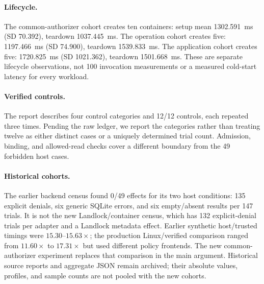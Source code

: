 \paragraph{Lifecycle.}
The common-authorizer cohort creates ten containers: setup mean 1302.591~ms
(SD 70.392), teardown 1037.445~ms. The operation cohort creates five:
1197.466~ms (SD 74.900), teardown 1539.833~ms. The application cohort creates
five: 1720.825~ms (SD 1021.362), teardown 1501.668~ms. These are separate
lifecycle observations, not 100 invocation measurements or a measured cold-start
latency for every workload.

\paragraph{Verified controls.}
The report describes four control categories and 12/12 controls, each repeated
three times. Pending the raw ledger, we report the categories rather than
treating twelve as either distinct cases or a uniquely determined trial count.
Admission, binding, and allowed-read checks cover a different boundary from
the 49 forbidden host cases.

\paragraph{Historical cohorts.}
The earlier backend census found 0/49 effects for its two host conditions:
135 explicit denials, six generic SQLite errors, and six empty/absent results
per 147 trials. It is not the new Landlock/container census, which has 132
explicit-denial trials per adapter and a Landlock metadata effect.
Earlier synthetic host/trusted timings were $15.30$--$15.63\times$; the
production Linux/verified comparison ranged from $11.60\times$ to
$17.31\times$ but used
different policy frontends. The new common-authorizer experiment replaces that
comparison in the main argument. Historical source reports and aggregate JSON
remain archived; their absolute values, profiles, and sample counts are not
pooled with the new cohorts.
